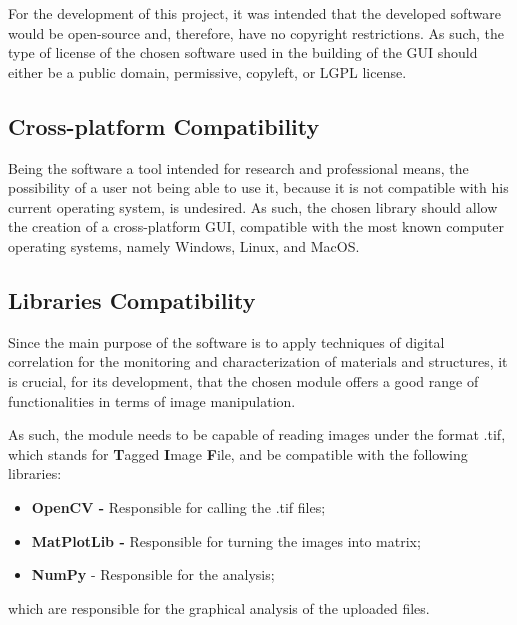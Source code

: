 For the development of this project, it was intended that the developed software would be open-source and, therefore, have no copyright restrictions. As such, the type of license of the chosen software used in the building of the GUI should either be a public domain, permissive, copyleft, or LGPL license.


\subsection{Cross-platform Compatibility}
\label{sub:platform_compatibility}

\indent \indent Being the software a tool intended for research and professional means, the possibility of a user not being able to use it, because it is not compatible with his current operating system, is undesired. As such, the chosen library should allow the creation of a cross-platform GUI, compatible with the most known computer operating systems, namely Windows, Linux, and MacOS.


\subsection{Libraries Compatibility}
\label{sub:libraries_compatibility}

\indent \indent Since the main purpose of the software is to apply techniques of digital correlation for the monitoring and characterization of materials and structures, it is crucial, for its development, that the chosen module offers a good range of functionalities in terms of image manipulation.

As such, the module needs to be capable of reading images under the format .tif, which stands for \textbf{T}agged \textbf{I}mage \textbf{F}ile, and be compatible with the following libraries:
\begin{itemize}
  \item \textbf{OpenCV -} Responsible for calling the .tif files;
  \item \textbf{MatPlotLib -} Responsible for turning the images into matrix;
  \item \textbf{NumPy} - Responsible for the analysis; %
\end{itemize}
which are responsible for the graphical analysis of the uploaded files.

